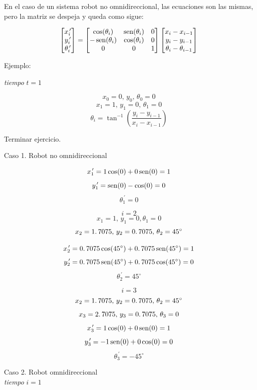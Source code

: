 En el caso de un sistema robot no omnidireccional, las ecuaciones son las mismas, pero la matriz se despeja y queda como sigue:

$$
\begin{bmatrix}
x_{i}^{\,\prime} \\
y_{i}^{\, \prime} \\
\theta_{i}^{\, \prime}
\end{bmatrix} = \begin{bmatrix}
\cos (\theta_{i}) & \mathop{\rm sen}\nolimits (\theta_{i}) & 0 \\
- \mathop{\rm sen}\nolimits (\theta_{i}) & \cos (\theta_{i}) & 0 \\
0                     &                0      & 1
\end{bmatrix} \begin{bmatrix}
x_{i} - x_{i - 1} \\
y_{i} - y_{i - 1}\\
\theta_{i} - \theta_{i - 1}
\end{bmatrix} 
$$ 

Ejemplo:


\textit{tiempo} $t = 1$

$$x_{0} = 0,\, y_{0}, \, \theta_{0} = 0$$
$$x_{1} = 1,\, y_{1} = 0, \, \theta_{1} = 0$$
$$\theta_{i} = \tan^{-1} \left( \dfrac{y_{i} - y_{i - 1}}{x_{i} - x_{i - 1}} \right) $$

Terminar ejercicio.

Caso 1. Robot no omnidireccional

$$x_{1}^{\, \prime} = 1 \cos (0) + 0 \mathop{\rm sen}\nolimits (0) = 1$$
$$y_{1}^{\, \prime} = \mathop{\rm sen}\nolimits (0) - \cos (0) = 0$$
$$\theta_{1}^{\, \prime} = 0$$
	
$$i = 2$$
$$x_{1} = 1, \, y_{1} = 0, \theta_{1} = 0$$
$$x_{2} = 1\ldotp 7075,\, y_{2} = 0\ldotp 7075, \, \theta_{2} = 45^\circ$$

$$x_{2}^{\, \prime} = 0\ldotp7075 \cos (45^\circ) + 0\ldotp7075 \mathop{\rm sen}\nolimits (45^\circ) = 1$$
$$y_{2}^{\, \prime} = 0\ldotp7075 \mathop{\rm sen}\nolimits (45^\circ) + 0\ldotp7075 \cos (45^\circ) = 0$$
$$\theta_{2}^{\, \prime} = 45^\circ$$

$$i = 3$$
$$x_{2} = 1\ldotp7075,\, y_{2} = 0\ldotp7075,\, \theta_{2} = 45^\circ$$
$$x_{3} = 2\ldotp7075,\, y_{3} = 0\ldotp7075,\, \theta_{3} = 0$$
$$x_{3}^{\,\prime} = 1 \cos (0) + 0\mathop{\rm sen}\nolimits (0) = 1$$
$$y_{3}^{\,\prime} = - 1 \mathop{\rm sen}\nolimits (0) + 0\cos (0) = 0$$
$$\theta_{3}^{\,\prime} = -45^\circ$$

Caso 2. Robot omnidireccional \\
\textit{tiempo} $i = 1$

